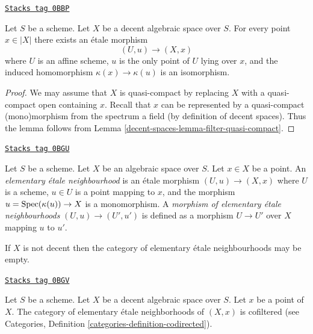 \begin{lemma}
\label{decent-spaces-lemma-decent-space-elementary-etale-neighbourhood}
\href{https://stacks.math.columbia.edu/tag/0BBP}{\texttt{Stacks tag 0BBP}}

Let $S$ be a scheme. Let $X$ be a decent algebraic space over $S$.
For every point $x \in |X|$ there exists an \'etale morphism
$$
(U, u) \longrightarrow (X, x)
$$
where $U$ is an affine scheme, $u$ is the only point of $U$ lying
over $x$, and the induced homomorphism $\kappa(x) \to \kappa(u)$
is an isomorphism.
\end{lemma}

\begin{proof}
We may assume that $X$ is quasi-compact by replacing $X$ with a
quasi-compact open containing $x$. Recall that $x$ can be
represented by a quasi-compact (mono)morphism
from the spectrum a field (by definition of decent spaces). Thus the
lemma follows from Lemma \ref{decent-spaces-lemma-filter-quasi-compact}.
\end{proof}

\begin{definition}
\label{decent-spaces-definition-elemenary-etale-neighbourhood}
\href{https://stacks.math.columbia.edu/tag/0BGU}{\texttt{Stacks tag 0BGU}}

Let $S$ be a scheme. Let $X$ be an algebraic space over $S$.
Let $x \in X$ be a point. An {\it elementary \'etale neighbourhood}
is an \'etale morphism $(U, u) \to (X, x)$ where $U$ is a scheme,
$u \in U$ is a point mapping to $x$, and the morphism
$u = \operatorname{Spec}(\kappa(u)) \to X$ is a monomorphism.
A {\it morphism of elementary \'etale neighbourhoods}
$(U, u) \to (U', u')$ is defined as a morphism $U \to U'$
over $X$ mapping $u$ to $u'$.
\end{definition}

If $X$ is not decent then the category of elementary \'etale neighbourhoods
may be empty.

\begin{lemma}
\label{decent-spaces-lemma-elementary-etale-neighbourhoods}
\href{https://stacks.math.columbia.edu/tag/0BGV}{\texttt{Stacks tag 0BGV}}

Let $S$ be a scheme. Let $X$ be a decent algebraic space over $S$.
Let $x$ be a point of $X$.
The category of elementary \'etale neighborhoods of $(X, x)$
is cofiltered (see
Categories, Definition \ref{categories-definition-codirected}).
\end{lemma}

